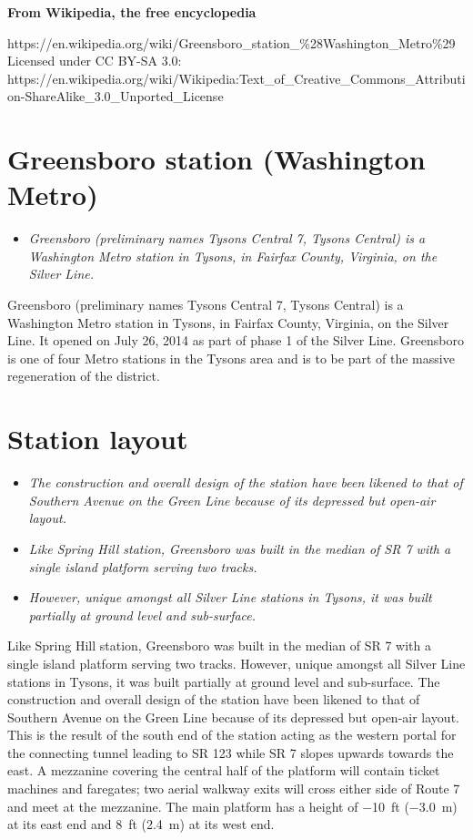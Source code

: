\textbf{From Wikipedia, the free encyclopedia}

https://en.wikipedia.org/wiki/Greensboro\_station\_\%28Washington\_Metro\%29\\
Licensed under CC BY-SA 3.0:\\
https://en.wikipedia.org/wiki/Wikipedia:Text\_of\_Creative\_Commons\_Attribution-ShareAlike\_3.0\_Unported\_License

\section{Greensboro station (Washington
Metro)}\label{greensboro-station-washington-metro}

\begin{itemize}
\item
  \emph{Greensboro (preliminary names Tysons Central 7, Tysons Central)
  is a Washington Metro station in Tysons, in Fairfax County, Virginia,
  on the Silver Line.}
\end{itemize}

Greensboro (preliminary names Tysons Central 7, Tysons Central) is a
Washington Metro station in Tysons, in Fairfax County, Virginia, on the
Silver Line. It opened on July 26, 2014 as part of phase 1 of the Silver
Line. Greensboro is one of four Metro stations in the Tysons area and is
to be part of the massive regeneration of the district.

\section{Station layout}\label{station-layout}

\begin{itemize}
\item
  \emph{The construction and overall design of the station have been
  likened to that of Southern Avenue on the Green Line because of its
  depressed but open-air layout.}
\item
  \emph{Like Spring Hill station, Greensboro was built in the median of
  SR 7 with a single island platform serving two tracks.}
\item
  \emph{However, unique amongst all Silver Line stations in Tysons, it
  was built partially at ground level and sub-surface.}
\end{itemize}

Like Spring Hill station, Greensboro was built in the median of SR 7
with a single island platform serving two tracks. However, unique
amongst all Silver Line stations in Tysons, it was built partially at
ground level and sub-surface. The construction and overall design of the
station have been likened to that of Southern Avenue on the Green Line
because of its depressed but open-air layout. This is the result of the
south end of the station acting as the western portal for the connecting
tunnel leading to SR 123 while SR 7 slopes upwards towards the east. A
mezzanine covering the central half of the platform will contain ticket
machines and faregates; two aerial walkway exits will cross either side
of Route 7 and meet at the mezzanine. The main platform has a height of
−10~ft (−3.0~m) at its east end and 8~ft (2.4~m) at its west end.

